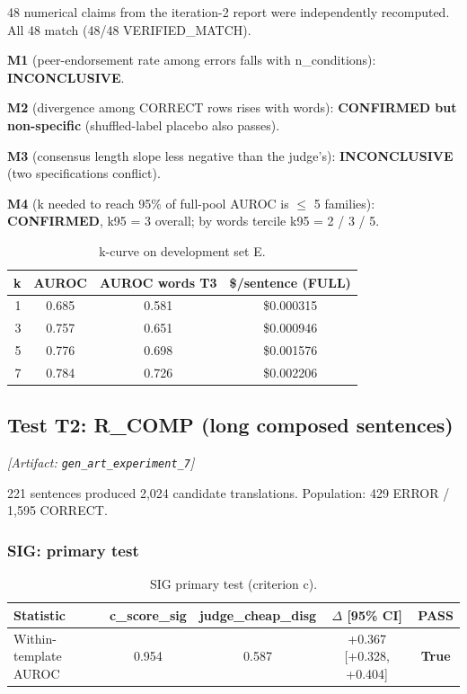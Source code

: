 \documentclass[11pt,letterpaper]{article}
\begin{document}
48 numerical claims from the iteration-2 report were independently recomputed. All 48 match (48/48 VERIFIED\_MATCH).

\textbf{M1} (peer-endorsement rate among errors falls with n\_conditions): \textbf{INCONCLUSIVE}.

\textbf{M2} (divergence among CORRECT rows rises with words): \textbf{CONFIRMED but non-specific} (shuffled-label placebo also passes).

\textbf{M3} (consensus length slope less negative than the judge's): \textbf{INCONCLUSIVE} (two specifications conflict).

\textbf{M4} (k needed to reach 95\% of full-pool AUROC is $\leq$ 5 families): \textbf{CONFIRMED}, k95 = 3 overall; by words tercile k95 = 2 / 3 / 5.

\begin{table}[!htbp]
\centering
\caption{k-curve on development set E.}
\label{tab:k_curve}
\begin{tabular}{rccc}
\toprule
k & AUROC & AUROC words T3 & \$/sentence (FULL) \\
\midrule
1 & 0.685 & 0.581 & \$0.000315 \\
3 & 0.757 & 0.651 & \$0.000946 \\
5 & 0.776 & 0.698 & \$0.001576 \\
7 & 0.784 & 0.726 & \$0.002206 \\
\bottomrule
\end{tabular}
\end{table}

\subsection{Test T2: R\_COMP (long composed sentences)}
\label{sec:t2}
\noindent\textit{[Artifact: \texttt{gen\_art\_experiment\_7}]}

221 sentences produced 2,024 candidate translations. Population: 429 ERROR / 1,595 CORRECT.

\subsubsection{SIG: primary test}

\begin{table}[!htbp]
\centering
\caption{SIG primary test (criterion c).}
\label{tab:sig_primary}
\begin{tabular}{lcccc}
\toprule
Statistic & c\_score\_sig & judge\_cheap\_disg & $\Delta$ [95\% CI] & PASS \\
\midrule
Within-template AUROC & 0.954 & 0.587 & +0.367 [+0.328, +0.404] & \textbf{True} \\
\bottomrule
\end{tabular}
\end{table}
\end{document}
